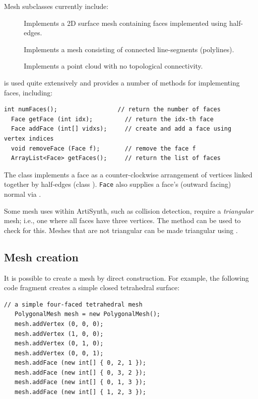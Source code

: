 Mesh subclasses currently include:

\begin{description}

\item[]\mbox{}

Implements a 2D surface
mesh containing faces implemented using half-edges.

\item[]\mbox{}

Implements a mesh
consisting of connected line-segments (polylines).

\item[]\mbox{}

Implements a point cloud with
no topological connectivity.

\end{description}

 is used quite extensively
and provides a number of methods for implementing faces, including:
%
\begin{lstlisting}[]
  int numFaces();                 // return the number of faces
  Face getFace (int idx);         // return the idx-th face
  Face addFace (int[] vidxs);     // create and add a face using vertex indices
  void removeFace (Face f);       // remove the face f
  ArrayList<Face> getFaces();     // return the list of faces
\end{lstlisting}
%
The class  implements a face as a
counter-clockwise arrangement of vertices linked together by
half-edges (class ).
{\tt Face} also supplies a face's (outward facing) normal
via 
.

Some mesh uses within ArtiSynth, such as collision detection, require a
{\it triangular} mesh; i.e., one where all faces have three vertices.
The method 
can be used to check for this. Meshes that are not triangular can be
made triangular using 
.

\subsection{Mesh creation}

It is possible to create a mesh by direct construction. For example,
the following code fragment creates a simple closed tetrahedral
surface:
%
\begin{lstlisting}[]
   // a simple four-faced tetrahedral mesh 
   PolygonalMesh mesh = new PolygonalMesh();
   mesh.addVertex (0, 0, 0);
   mesh.addVertex (1, 0, 0);
   mesh.addVertex (0, 1, 0);
   mesh.addVertex (0, 0, 1);
   mesh.addFace (new int[] { 0, 2, 1 });
   mesh.addFace (new int[] { 0, 3, 2 });
   mesh.addFace (new int[] { 0, 1, 3 });
   mesh.addFace (new int[] { 1, 2, 3 });      
\end{lstlisting}
%

